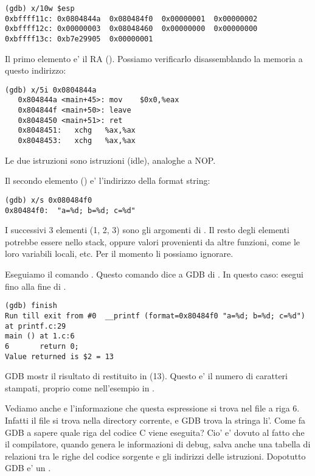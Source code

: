 \begin{lstlisting}
(gdb) x/10w $esp
0xbffff11c:	0x0804844a	0x080484f0	0x00000001	0x00000002
0xbffff12c:	0x00000003	0x08048460	0x00000000	0x00000000
0xbffff13c:	0xb7e29905	0x00000001
\end{lstlisting}

Il primo elemento e' il \ac{RA} ().
Possiamo verificarlo disassemblando la memoria a questo indirizzo:

\begin{lstlisting}[label=NOP_as_XCHG_example,style=customasmx86]
(gdb) x/5i 0x0804844a
   0x804844a <main+45>:	mov    $0x0,%eax
   0x804844f <main+50>:	leave  
   0x8048450 <main+51>:	ret    
   0x8048451:	xchg   %ax,%ax
   0x8048453:	xchg   %ax,%ax
\end{lstlisting}

Le due istruzioni  sono istruzioni  (idle), analoghe a \ac{NOP}.

Il secondo elemento () e' l'indirizzo della format string:

\begin{lstlisting}
(gdb) x/s 0x080484f0
0x80484f0:	"a=%d; b=%d; c=%d"
\end{lstlisting}

I successivi 3 elementi (1, 2, 3) sono gli argomenti di \printf.
Il resto degli elementi potrebbe essere  nello stack, oppure valori provenienti da altre funzioni, come le loro variabili locali, etc.
Per il momento li possiamo ignorare.

Eseguiamo il comando . 
Questo comando dice a GDB di .
In questo caso: esegui fino alla fine di \printf.

\begin{lstlisting}
(gdb) finish
Run till exit from #0  __printf (format=0x80484f0 "a=%d; b=%d; c=%d") at printf.c:29
main () at 1.c:6
6		return 0;
Value returned is $2 = 13
\end{lstlisting}

\ac{GDB} mostr il risultato di \printf restituito in \EAX (13).
Questo e' il numero di caratteri stampati, proprio come nell'esempio in \olly.

Vediamo anche  e l'informazione che questa espressione si trova nel file  a riga 6.
Infatti il file  si trova nella directory corrente, e \ac{GDB} trova la stringa li'.
Come fa \ac{GDB} a sapere quale riga del codice C viene eseguita?
Cio' e' dovuto al fatto che il compilatore, quando genera le informazioni di debug, salva anche una tabella di relazioni tra le righe del
codice sorgente e gli indirizzi delle istruzioni.
Dopotutto GDB e' un .

